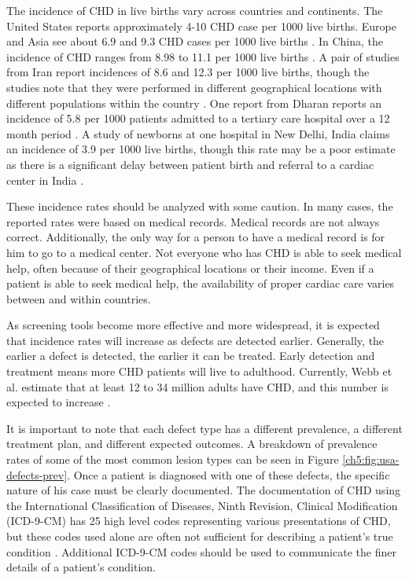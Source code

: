 The incidence of CHD in live births vary across countries and continents. The United States reports approximately 4-10 CHD case per 1000 live births. Europe and Asia see about 6.9 and 9.3 CHD cases per 1000 live births \cite{Mozaffarian2016}. 
In China, the incidence of CHD ranges from 8.98 to 11.1 per 1000 live births \cite{Zhao2019} \cite{Qu2016}. 
A pair of studies from Iran report incidences of 8.6 and 12.3 per 1000 live births, though the studies note that they were performed in different geographical locations with different populations within the country \cite{Nikyar2011} \cite{Rahim2008}.
One report from Dharan reports an incidence of 5.8 per 1000 patients admitted to a tertiary care hospital over a 12 month period \cite{Shah2008}. A study of newborns at one hospital in New Delhi, India claims an incidence of 3.9 per 1000 live births, though this rate may be a poor estimate as there is a significant delay between patient birth and referral to a cardiac center in India \cite{Khalil1994} \cite{Saxena2005}.

These incidence rates should be analyzed with some caution. In many cases, the reported rates were based on medical records. Medical records are not always correct. Additionally, the only way for a person to have a medical record is for him to go to a medical center. Not everyone who has CHD is able to seek medical help, often because of their geographical locations or their income. Even if a patient is able to seek medical help, the availability of proper cardiac care varies between and within countries. 

As screening tools become more effective and more widespread, it is expected that incidence rates will increase as defects are detected earlier. Generally, the earlier a defect is detected, the earlier it can be treated. Early detection and treatment means more CHD patients will live to adulthood. Currently, Webb et al. estimate that at least 12 to 34 million adults have CHD, and this number is expected to increase \cite{Webb2015}.

It is important to note that each defect type has a different prevalence, a different treatment plan, and different expected outcomes. A breakdown of prevalence rates of some of the most common lesion types can be seen in Figure \ref{ch5:fig:usa-defects-prev}. %
Once a patient is diagnosed with one of these defects, the specific nature of his case must be clearly documented. The documentation of CHD using the International Classification of Diseases, Ninth Revision, Clinical Modification (ICD-9-CM) has 25 high level codes representing various presentations of CHD, but these codes used alone are often not sufficient for describing a patient's true condition \cite{Mozaffarian2016}. Additional ICD-9-CM codes should be used to communicate the finer details of a patient's condition. 

